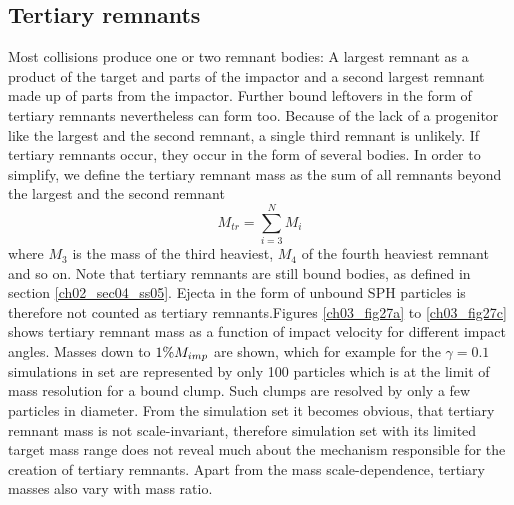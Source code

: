 \subsection{Tertiary remnants}
Most collisions produce one or two remnant bodies: A largest remnant as a product of the target and parts of the impactor and a second largest remnant made up of parts from the impactor. Further bound leftovers in the form of tertiary remnants nevertheless can form too. Because of the lack of a progenitor like the largest and the second remnant, a single third remnant is unlikely. If tertiary remnants occur, they occur in the form of several bodies. In order to simplify, we define the tertiary remnant mass as the sum of all remnants beyond the largest and the second remnant
\begin{equation}
M_{tr} = \sum_{i = 3}^N M_i
\end{equation}
where $M_3$ is the mass of the third heaviest, $M_4$ of the fourth heaviest remnant and so on. Note that tertiary remnants are still bound bodies, as defined in section \ref{ch02_sec04_ss05}. Ejecta in the form of unbound SPH particles is therefore not counted as tertiary remnants.Figures \ref{ch03_fig27a} to \ref{ch03_fig27c} shows tertiary remnant mass as a function of impact velocity for different impact angles. Masses down to $1 \% M_{imp}$ are shown, which for example for the $\gamma = 0.1$ simulations in set \css are represented by only 100 particles which is at the limit of mass resolution for a bound clump. Such clumps are resolved by only a few particles in diameter. From the \css simulation set it becomes obvious, that tertiary remnant mass is not scale-invariant, therefore simulation set \rss with its limited target mass range does not reveal much about the mechanism responsible for the creation of tertiary remnants. Apart from the mass scale-dependence, tertiary masses also vary with mass ratio. 

